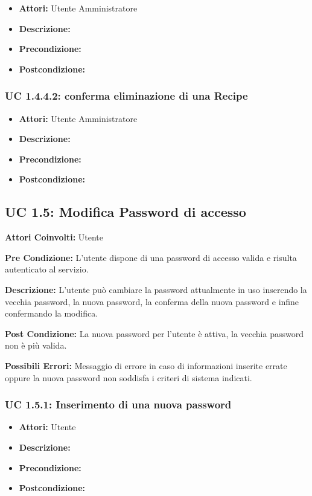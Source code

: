 \begin{itemize}
\item \textbf{Attori:} Utente Amministratore
\item \textbf{Descrizione:} 
\item \textbf{Precondizione:} 
\item \textbf{Postcondizione:} 
\end{itemize}

\subsubsection{UC 1.4.4.2: conferma eliminazione di una Recipe}

\begin{itemize}
\item \textbf{Attori:} Utente Amministratore
\item \textbf{Descrizione:} 
\item \textbf{Precondizione:} 
\item \textbf{Postcondizione:} 
\end{itemize}



\subsection{UC 1.5: Modifica Password di accesso}

\textbf{Attori Coinvolti:}
Utente

\textbf{Pre Condizione:}
L'utente dispone di una password di accesso valida e risulta autenticato al servizio.

\textbf{Descrizione:}
L'utente può cambiare la password attualmente in uso inserendo la vecchia password, la nuova password, la conferma della nuova password e infine confermando la modifica.

\textbf{Post Condizione:}
La nuova password per l'utente è attiva, la vecchia password non è più valida.

\textbf{Possibili Errori:}
Messaggio di errore in caso di informazioni inserite errate oppure la nuova password non soddisfa i criteri di sistema indicati.

\subsubsection{UC 1.5.1: Inserimento di una nuova password}

\begin{itemize}
\item \textbf{Attori:} Utente
\item \textbf{Descrizione:} 
\item \textbf{Precondizione:} 
\item \textbf{Postcondizione:} 
\end{itemize}

